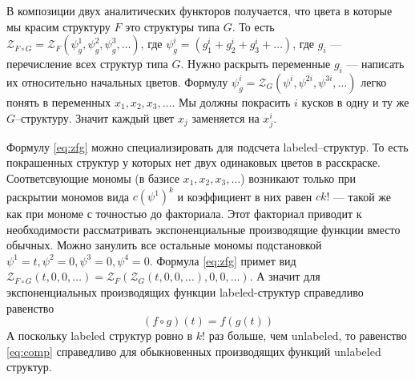 В композиции двух аналитических функторов получается, что цвета в которые мы
красим структуру $F$ это структуры типа $G$. То есть $\mathcal Z_{F \circ G} =
\mathcal Z_F(\psi_g^1, \psi_g^2, \psi_g^3, \dots)$, где $\psi_g^i = (g_1^i +
g_2^i + g_3^i + \dots)$, где $g_i$ --- перечисление всех структур типа $G$.
Нужно раскрыть переменные $g_i $ --- написать их относительно начальных цветов.
Формулу $\psi_g^i = \mathcal Z_G(\psi^i, \psi^{2i}, \psi^{3i}, \dots)$ легко
понять в переменных $x_1, x_2, x_3, \dots$. Мы должны покрасить $i$ кусков в
одну и ту же $G$--структуру. Значит каждый цвет $x_j$ заменяется на $x_j^i$.

Формулу \ref{eq:zfg} можно специализировать для подсчета labeled--структур. То
есть покрашенных структур у которых нет двух одинаковых цветов в расскраске.
Соответсвующие мономы (в базисе $x_1, x_2, x_3, \dots$) возникают только при
раскрытии мономов вида $c(\psi^1)^k$ и коэффициент в них равен $ck!$ --- такой
же как при мономе с точностью до факториала. Этот факториал приводит к
необходимости рассматривать экспоненциальные производящие функции вместо
обычных. Можно занулить все остальные мономы подстановкой $\psi^1 = t, \psi^2 =
0, \psi^3 = 0, \psi^4 = 0$. Формула \ref{eq:zfg} примет вид $
\mathcal Z_{F \circ G} (t, 0, 0, \dots) =
	\mathcal Z_F(
		\mathcal Z_G(t, 0, 0, \dots), 0, 0, \dots
	)
$.
А значит для экспоненциальных производящих функции labeled-структур справедливо
равенство
\begin{equation}
\label{eq:comp}
(f \circ g) (t) = f(g(t))
\end{equation}
А поскольку labeled структур ровно в $k!$ раз больше, чем unlabeled, то
равенство \ref{eq:comp} справедливо для обыкновенных производящих функций
unlabeled структур.

